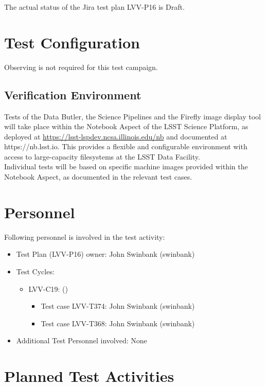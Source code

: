 \documentclass[DM,lsstdraft,STR,toc]{lsstdoc}
\begin{document}
The actual status of the Jira test plan LVV-P16 is Draft.

\section{Test Configuration}
\label{sect:configuration}

Observing is not required for this test campaign.

\subsection{Verification Environment}
\label{sect:hwconf}
Tests of the Data Butler, the Science Pipelines and the Firefly image
display tool will take place within the Notebook Aspect of the LSST
Science Platform, as deployed at
\url{https://lsst-lspdev.ncsa.illinois.edu/nb} and documented at
https://nb.lsst.io. This provides a flexible and configurable
environment with access to large-capacity filesystems at the LSST Data
Facility.\\[2\baselineskip]Individual tests will be based on specific
machine images provided within the Notebook Aspect, as documented in the
relevant test cases.~





\section{Personnel}
\label{sect:personnel}

Following personnel is involved in the test activity:

\begin{itemize}
\item Test Plan (LVV-P16) owner: John Swinbank (swinbank)
\item Test Cycles:
\begin{itemize}
  \item LVV-C19:  ()
  \begin{itemize}
    \item Test case LVV-T374: John Swinbank (swinbank)
    \item Test case LVV-T368: John Swinbank (swinbank)
  \end{itemize}
\end{itemize}
\item Additional Test Personnel involved: None
\end{itemize}

\newpage
\section{Planned Test Activities}
\label{sect:plannedtestactivities}
\end{document}
